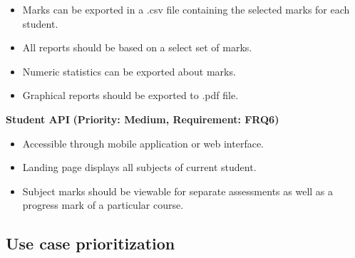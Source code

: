 \documentclass[12pt]{article}
\begin{document}
				\begin{itemize}
					\item Marks can be exported in a .csv file containing the selected marks for each student.
					\item All reports should be based on a select set of marks.
					\item Numeric statistics can be exported about marks.
					\item Graphical reports should be exported to .pdf file.
				\end{itemize}
				
			\vspace{0.2in}
			
			\begin{flushleft}
				\textbf{Student API}
				\textbf{(Priority: Medium, Requirement: FRQ6)}
			\end{flushleft}
			
				\begin{itemize}
					\item Accessible through mobile application or web interface.
					\item Landing page displays all subjects of current student.
					\item Subject marks should be viewable for separate assessments as well as a progress mark of a particular course.
				\end{itemize}
				
			\vspace{0.2in}
		
		\subsection{Use case prioritization}
		
			\vspace{0.2in}
			
\end{document}
